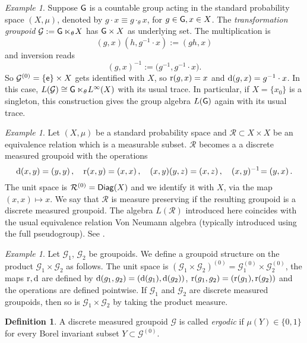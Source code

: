 \documentclass[a4paper,11pt]{article}
\numberwithin{equation}{section}
\theoremstyle{definition}
\newtheorem{defn}[thm]{Definition}
\theoremstyle{remark}
\newtheorem{ex}[thm]{Example}
\numberwithin{equation}{section}
\newcommand{\rG}{\mathcal{G}}
\def\e{{\sf e}}
\def\r{{\rm r}}
\def\d{{\rm d}}
\def\G{{\sf G}}
\numberwithin{equation}{section}
\begin{document}
\begin{ex}\label{transformation}
Suppose $\G$ is a countable group acting in the standard probability space $(X,\mu)$, denoted by $g\cdot x\equiv g\cdot_\theta x$, for $g\in\G, x\in X$. The {\it transformation groupoid} $\rG:=\G\ltimes_\theta\!X$ has $\G\times X$ as underlying set. The multiplication is $$(g,x)(h,g^{-1}\cdot x):=(gh,x)$$ and inversion reads $$(g,x)^{-1}:=\big(g^{-1}\!,g^{-1}\cdot x\big).$$ So $\rG^{(0)}=\{\e\}\times X$ gets identified with $X$, so $\r(g,x)=x$ and $\d(g,x)=g^{-1}\cdot x$. In this case, $L(\rG)\cong \G\ltimes_\theta\!L^\infty(X)$ with its usual trace. In particular, if $X=\{x_0\}$ is a singleton, this construction gives the group algebra $L(\G)$ again with its usual trace.
\end{ex}

\begin{ex}\label{equivrel}
Let $(X,\mu)$ be a standard probability space and $\mathcal R\subset X\times X$ be an equivalence relation which is a measurable subset. $\mathcal R$ becomes a a discrete measured groupoid with the operations 
$$
\d(x,y)=(y,y)\,,\quad \r(x,y)=(x,x)\,,\quad (x,y)(y,z)=(x,z)\,,\quad(x,y)^{-1}\!=(y,x)\,.
$$
The unit space is $\mathcal R^{(0)}={\sf Diag}(X)$ and we identify it with $X$, via the map $(x,x)\mapsto x$. We say that $\mathcal R$ is measure preserving if the resulting groupoid is a discrete measured groupoid. The algebra $L(\mathcal R)$ introduced here coincides with the usual equivalence relation Von Neumann algebra (typically introduced using the full pseudogroup). See \textcite[Section 2.2]{hoff:16}.
\end{ex}



\begin{ex}\label{prodgrpds}
  Let $ \rG_{1} $, $ \rG_{2} $ be groupoids. We define a groupoid structure on the product $ \rG_{1}\times \rG_{2} $ as follows. The unit space is $ (\rG_{1}\times\rG_{2})^{(0)} = \rG_{1}^{(0)}\times\rG_{2}^{(0)} $, the maps $\r,\d$ are defined by $ \d(g_{1},g_{2}) = (\d(g_{1}),\d(g_{2})) $, $ \r(g_{1},g_{2}) = (\r(g_{1}),\r(g_{2})) $ and the operations are defined pointwise. If $ \rG_{1} $ and $ \rG_{2} $ are discrete measured groupoids, then so is $ \rG_{1}\times \rG_{2} $ by taking the product measure.
\end{ex}


\begin{defn}
    A discrete measured groupoid $\rG$ is called {\it ergodic} if $\mu(Y)\in\{0,1\}$ for every Borel invariant subset $Y\subset \rG^{(0)}$.
\end{defn}
\end{document}
